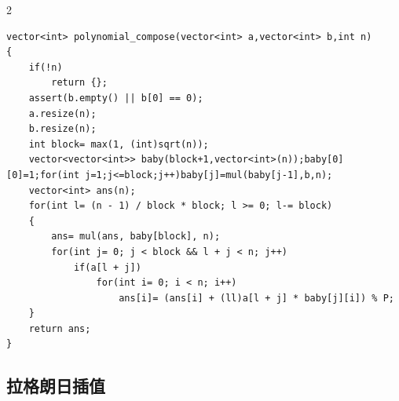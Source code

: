 \documentclass[UTF8,fontset=fandol,a4paper,twoside]{ctexart}
\begin{document}
\begin{multicols}{2}
\begin{lstlisting}
vector<int> polynomial_compose(vector<int> a,vector<int> b,int n)
{
    if(!n)
        return {};
    assert(b.empty() || b[0] == 0);
    a.resize(n);
    b.resize(n);
    int block= max(1, (int)sqrt(n));
    vector<vector<int>> baby(block+1,vector<int>(n));baby[0][0]=1;for(int j=1;j<=block;j++)baby[j]=mul(baby[j-1],b,n);
    vector<int> ans(n);
    for(int l= (n - 1) / block * block; l >= 0; l-= block)
    {
        ans= mul(ans, baby[block], n);
        for(int j= 0; j < block && l + j < n; j++)
            if(a[l + j])
                for(int i= 0; i < n; i++)
                    ans[i]= (ans[i] + (ll)a[l + j] * baby[j][i]) % P;
    }
    return ans;
}
\end{lstlisting}
\subsection{拉格朗日插值}


\end{multicols}
\end{document}
